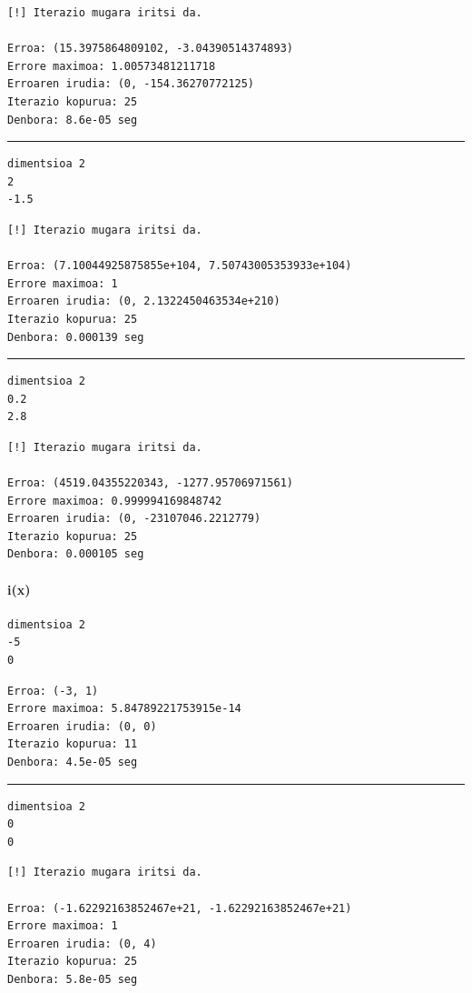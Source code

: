 \documentclass[10pt,a4paper,basque]{article}
\begin{document}
\begin{lstlisting}
[!] Iterazio mugara iritsi da.

Erroa: (15.3975864809102, -3.04390514374893)
Errore maximoa: 1.00573481211718
Erroaren irudia: (0, -154.36270772125)
Iterazio kopurua: 25
Denbora: 8.6e-05 seg
\end{lstlisting}

\rule{12cm}{0.4pt}

\begin{lstlisting}
dimentsioa 2
2
-1.5
\end{lstlisting}

\begin{lstlisting}
[!] Iterazio mugara iritsi da.

Erroa: (7.10044925875855e+104, 7.50743005353933e+104)
Errore maximoa: 1
Erroaren irudia: (0, 2.1322450463534e+210)
Iterazio kopurua: 25
Denbora: 0.000139 seg
\end{lstlisting}

\rule{12cm}{0.4pt}

\begin{lstlisting}
dimentsioa 2
0.2
2.8
\end{lstlisting}

\begin{lstlisting}
[!] Iterazio mugara iritsi da.

Erroa: (4519.04355220343, -1277.95706971561)
Errore maximoa: 0.999994169848742
Erroaren irudia: (0, -23107046.2212779)
Iterazio kopurua: 25
Denbora: 0.000105 seg
\end{lstlisting}

\paragraph{i(x)}

\begin{lstlisting}
dimentsioa 2
-5
0
\end{lstlisting}

\begin{lstlisting}
Erroa: (-3, 1)
Errore maximoa: 5.84789221753915e-14
Erroaren irudia: (0, 0)
Iterazio kopurua: 11
Denbora: 4.5e-05 seg
\end{lstlisting}

\rule{12cm}{0.4pt}

\begin{lstlisting}
dimentsioa 2
0
0
\end{lstlisting}

\begin{lstlisting}
[!] Iterazio mugara iritsi da.

Erroa: (-1.62292163852467e+21, -1.62292163852467e+21)
Errore maximoa: 1
Erroaren irudia: (0, 4)
Iterazio kopurua: 25
Denbora: 5.8e-05 seg
\end{lstlisting}
\end{document}
